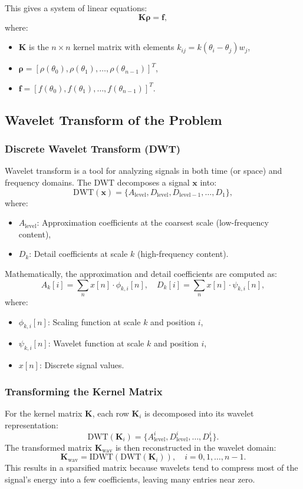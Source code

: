 \documentclass[12pt]{article}
\begin{document}
This gives a system of linear equations:
\[
    \mathbf{K} \boldsymbol{\rho} = \mathbf{f},
\]
where:
\begin{itemize}
    \item \(\mathbf{K}\) is the \(n \times n\) kernel matrix with elements \(k_{ij} = k(\theta_i - \theta_j) w_j\),
    \item \(\boldsymbol{\rho} = [\rho(\theta_0), \rho(\theta_1), \dots, \rho(\theta_{n-1})]^T\),
    \item \(\mathbf{f} = [f(\theta_0), f(\theta_1), \dots, f(\theta_{n-1})]^T\).
\end{itemize}

\subsection{Wavelet Transform of the Problem}

\subsubsection{Discrete Wavelet Transform (DWT)}
Wavelet transform is a tool for analyzing signals in both time (or space) and frequency domains. The DWT decomposes a signal \(\mathbf{x}\) into:
\[
    \text{DWT}(\mathbf{x}) = \{A_\text{level}, D_\text{level}, D_{\text{level}-1}, \dots, D_1\},
\]
where:
\begin{itemize}
    \item \(A_\text{level}\): Approximation coefficients at the coarsest scale (low-frequency content),
    \item \(D_k\): Detail coefficients at scale \(k\) (high-frequency content).
\end{itemize}

Mathematically, the approximation and detail coefficients are computed as:
\[
    A_k[i] = \sum_{n} x[n] \cdot \phi_{k,i}[n], \quad D_k[i] = \sum_{n} x[n] \cdot \psi_{k,i}[n],
\]
where:
\begin{itemize}
    \item \(\phi_{k,i}[n]\): Scaling function at scale \(k\) and position \(i\),
    \item \(\psi_{k,i}[n]\): Wavelet function at scale \(k\) and position \(i\),
    \item \(x[n]\): Discrete signal values.
\end{itemize}

\subsubsection{Transforming the Kernel Matrix}
For the kernel matrix \(\mathbf{K}\), each row \(\mathbf{K}_i\) is decomposed into its wavelet representation:
\[
    \text{DWT}(\mathbf{K}_i) = \{A_\text{level}^i, D_\text{level}^i, \dots, D_1^i\}.
\]
The transformed matrix \(\mathbf{K}_\text{wav}\) is then reconstructed in the wavelet domain:
\[
    \mathbf{K}_\text{wav} = \text{IDWT}(\text{DWT}(\mathbf{K}_i)), \quad i = 0, 1, \dots, n-1.
\]
This results in a sparsified matrix because wavelets tend to compress most of the signal's energy into a few coefficients, leaving many entries near zero.
\end{document}
